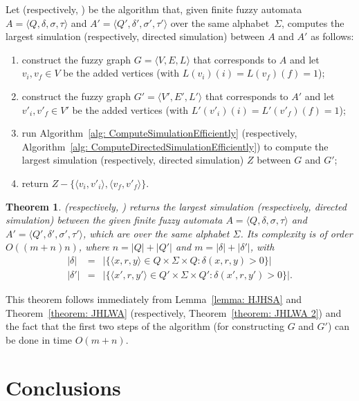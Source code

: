 \documentclass[11pt]{article}
\newcommand{\markRed}{}
\def\tuple#1{\langle#1\rangle}
\newtheorem{theorem}{Theorem}[section]
\begin{document}
{\markRed 
Let \AlgorithmSimFA (respectively, \AlgorithmDirSimFA) be the algorithm that, given finite fuzzy automata $A = \tuple{Q,\delta,\sigma,\tau}$ and $A' = \tuple{Q',\delta',\sigma',\tau'}$ over the same alphabet~$\Sigma$, computes the largest simulation (respectively, directed simulation) between $A$ and $A'$ as follows:
\begin{enumerate}
\item construct the fuzzy graph $G = \tuple{V,E,L}$ that corresponds to $A$ and let $v_i, v_f \in V$ be the added vertices (with $L(v_i)(i) = L(v_f)(f) = 1$); 
\item construct the fuzzy graph $G' = \tuple{V',E',L'}$ that corresponds to $A'$ and let $v'_i, v'_f \in V'$ be the added vertices (with $L'(v'_i)(i) = L'(v'_f)(f) = 1$); 
\item run Algorithm~\ref{alg: ComputeSimulationEfficiently} (respectively, Algorithm~\ref{alg: ComputeDirectedSimulationEfficiently}) to compute the largest simulation (respectively, directed simulation) $Z$ between $G$ and $G'$;
\item return $Z - \{\tuple{v_i,v'_i},\tuple{v_f,v'_f}\}$.
\end{enumerate}

\begin{theorem}
\AlgorithmSimFA (respectively, \AlgorithmDirSimFA) returns the largest simulation (respectively, directed simulation) between the given finite fuzzy automata $A = \tuple{Q,\delta,\sigma,\tau}$ and $A' = \tuple{Q',\delta',\sigma',\tau'}$, which are over the same alphabet $\Sigma$. Its complexity is of order $O((m+n)n)$, where $n = |Q| + |Q'|$ and $m = |\delta| + |\delta'|$, with 
\begin{eqnarray*}
|\delta| & = & |\{\tuple{x,r,y} \in Q \times \Sigma \times Q : \delta(x,r,y) > 0\}| \\
|\delta'| & = & |\{\tuple{x',r,y'} \in Q' \times \Sigma \times Q' : \delta(x',r,y') > 0\}|.
\end{eqnarray*} 
\end{theorem}

This theorem follows immediately from Lemma~\ref{lemma: HJHSA} and Theorem~\ref{theorem: JHLWA} (respectively, Theorem~\ref{theorem: JHLWA 2}) and the fact that the first two steps of the algorithm (for constructing $G$ and $G'$) can be done in time $O(m+n)$.
}

\section{Conclusions}
\label{sec: conc}
\end{document}
